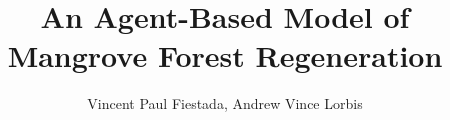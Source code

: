\documentclass[12pt]{article}
\title{An Agent-Based Model of Mangrove Forest Regeneration}
\author{Vincent Paul Fiestada, Andrew Vince Lorbis}
\begin{document}
\maketitle
\tableofcontents

\begin{abstract}
	
\end{abstract}
	
\end{document}
